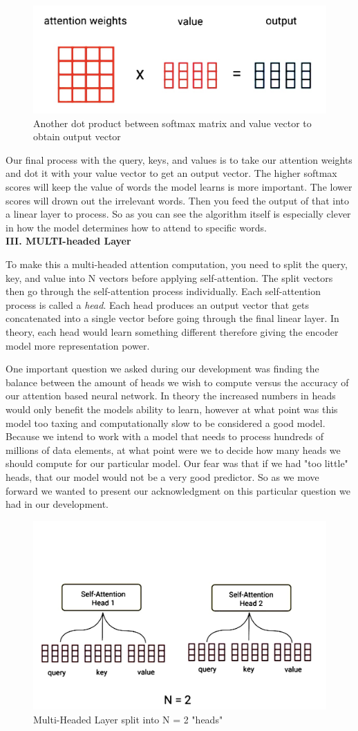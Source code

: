 \begin{figure}[H]
\centering
\includegraphics[width=.35\textwidth]{figures/t8.jpg}
\caption{Another dot product between softmax matrix and value vector to obtain output vector}
\end{figure}

Our final process with the query, keys, and values is to take our attention weights and dot it with your value vector to get an output vector. The higher softmax scores will keep the value of words the model learns is more important. The lower scores will drown out the irrelevant words. Then you feed the output of that into a linear layer to process. So as you can see the algorithm itself is especially clever in how the model determines how to attend to specific words. \\

\noindent
\textbf{III. MULTI-headed Layer}

To make this a multi-headed attention computation, you need to split the query, key, and value into N vectors before applying self-attention. The split vectors then go through the self-attention process individually. Each self-attention process is called a \emph{head}. Each head produces an output vector that gets concatenated into a single vector before going through the final linear layer. In theory, each head would learn something different therefore giving the encoder model more representation power.

One important question we asked during our development was finding the balance between the amount of heads we wish to compute versus the accuracy of our attention based neural network. In theory the increased numbers in heads would only benefit the models ability to learn, however at what point was this model too taxing and computationally slow to be considered a good model. Because we intend to work with a model that needs to process hundreds of millions of data elements, at what point were we to decide how many heads we should compute for our particular model. Our fear was that if we had "too little" heads, that our model would not be a very good predictor. So as we move forward we wanted to present our acknowledgment on this particular question we had in our development. 

\begin{figure}[H]
\centering
\includegraphics[width=.4\textwidth]{figures/t9.jpg}
\caption{Multi-Headed Layer split into N = 2 "heads"}
\end{figure}

